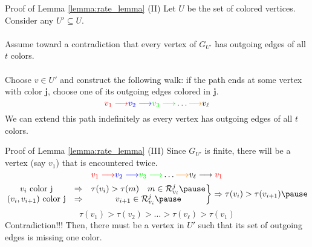 \begin{frame}{Proof of Lemma \ref{lemma:rate_lemma} (II)}
    Let $U$ be the set of colored vertices. Consider any $U' \subseteq U$. \\~\\
    
    Assume toward a contradiction that every vertex of $G_{U'}$ has outgoing edges of all $t$ colors. \\~\\
    
    Choose $v \in U'$ and construct the following walk: if the path ends at some vertex with color $\mathbf{j}$, choose one of its outgoing edges colored in $\mathbf{j}$.
    $$\textcolor{red}{v_1 \longrightarrow } \textcolor{blue}{v_2 \longrightarrow} \textcolor{green}{v_3 \longrightarrow} \dots \textcolor{orange}{\longrightarrow} v_\ell$$
    We can extend this path indefinitely as every vertex has outgoing edges of all $t$ colors.
\end{frame}

\begin{frame}{Proof of Lemma \ref{lemma:rate_lemma} (III)}
    Since $G_{U'}$ is finite, there will be a vertex (say $v_1$) that is encountered twice.
    $$\textcolor{red}{v_1 \longrightarrow } \textcolor{blue}{v_2 \longrightarrow} \textcolor{green}{v_3 \longrightarrow} \dots \textcolor{orange}{\longrightarrow} v_\ell \longrightarrow \textcolor{red}{v_1}$$ \pause
        $$
            \left .
                \begin{matrix}
                    v_i  \mbox{ color j} & \Rightarrow & \tau(v_i) > \tau(m) \quad m \in \R_{v_i}^j \pause \\
                    (v_i, v_{i+1}) \mbox{ color j} & \Rightarrow & v_{i+1} \in \R_{v_i}^j \pause
                \end{matrix}
            \right \}
            \Rightarrow \tau (v_i) > \tau (v_{i+1}) \pause
        $$ 
        $$
            \tau (v_1) > \tau (v_2) > \dots > \tau (v_\ell) > \tau (v_1) 
        $$ \pause
        Contradiction!!! Then, there must be a vertex in $U'$ such that its set of outgoing edges is missing one color.
        
\end{frame}

